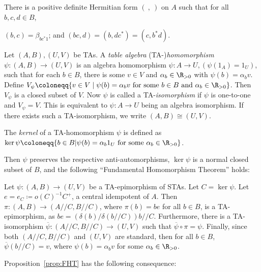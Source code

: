 There is a positive definite Hermitian form $(\ ,\ )$ on $A$ such that
for
all $b,c,d \in B$,
\begin{center}
$(b,c) = \beta_{bc^*1}$; and
$(bc,d) = (b,dc^*) = (c,b^*d)$.
\end{center}

\begin{defi}
\label{def:TA-hom}
Let $(A, B), (U, V)$ be TAs. A \emph{table algebra} 
\textup{(}TA-\textup{)}\emph{homomorphism} 
$\psi: (A, B) \rightarrow (U, V)$ 
is an algebra homomorphism $\psi: A \rightarrow U, (\psi (1_A) = 1_U)$,
such that for each $b \in B$, there is some $v \in V$ and $\alpha_{b}
\in \R_{>0}$ with
$ \psi(b) = \alpha_{b}v$.
Define
$V_{\psi} \coloneqq \{ v \in V \mid \psi(b) = \alpha_bv \mbox{ for some }b \in
B \mbox{ and } \alpha_b \in \R_{>0}\}$. Then $V_{\psi}$ is a closed
subset of $V$. 
Now $\psi$ is called a TA-\emph{isomorphism} if $\psi$ is one-to-one
and $V_{\psi} = V$. This is equivalent to $\psi: A \rightarrow U$
being an algebra isomorphism. If there exists such a TA-isomorphism, 
we 
write $(A, B) \cong (U, V)$.
\end{defi}

\begin{defi}
\label{def:kernel}
The \emph{kernel} of a TA-homomorphism $\psi$ is defined as
$\ker \psi \coloneqq \{b \in B \vert \psi(b) = \alpha_b1_U \mbox{ for some
}\alpha_b \in \R_{>0}\}$.
\end{defi}

Then $\psi$ preserves the respective anti-automorphisms, $\ker \psi$ is a normal closed subset of $B$, and the
following ``Fundamental Homomorphism Theorem'' holds:
 

\begin{prop}
\label{prop:FHT}
Let $\psi : (A, B) \rightarrow (U, V)$ be a TA-epimorphism of STAs. Let
$C = \ker \psi$. Let $e = e_C \coloneqq o(C)^{-1}C^+$, a central
idempotent of $A$. Then $\pi : (A, B) \rightarrow (A//C, B//C)$, where
$\pi(b) = be$ for all $b \in B$, is a TA-epimorphism, as $be =
(\delta(b)/\delta(b//C))b//C$. Furthermore, there is a TA-isomorphism
$\overline{\psi} : (A//C, B//C) \rightarrow (U, V)$ such that
$\overline{\psi}\circ \pi = \psi$. Finally, since both $(A//C, B//C)$
and $(U, V)$ are standard, then for all $b \in B$,
$\overline{\psi}(b//C) = v$, where $\psi(b) = \alpha_bv$ for some
$\alpha_b \in {\R}_{>0}$. 
\end{prop} 


Proposition~\ref{prop:FHT} has the following consequence:

